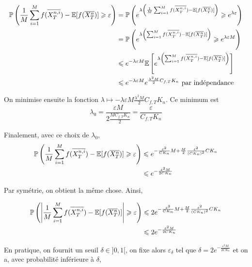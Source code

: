 \begin{equation*}
\begin{split}
  \mathbb{P}\left( \frac{1}{M} \sum_{i=1}^M f(\overline{X_T^{n,i}}) - \mathbb{E}[f(\overline{X_T^n})] \geqslant \varepsilon \right) &=  \mathbb{P}\left( e^{\lambda \left(\frac{1}{M} \sum_{i=1}^M f(\overline{X_T^{n,i}}) - \mathbb{E}[f(\overline{X_T^n})]\right)} \geqslant e^{\lambda \varepsilon} \right) \\
  &= \mathbb{P}\left( e^{\lambda \left( \sum_{i=1}^M f(\overline{X_T^{n,i}}) - \mathbb{E}[f(\overline{X_T^n})]\right)} \geqslant e^{\lambda \varepsilon M} \right) \\
  &\leqslant e^{-\lambda \varepsilon M} \mathbb{E}\left[ e^{\lambda \left( \sum_{i=1}^M f(\overline{X_T^{n,i}}) - \mathbb{E}[f(\overline{X_T^n})]\right)} \right] \\
  &\leqslant e^{-\lambda \varepsilon M} e^{ \frac{\lambda^2 M}{2} C_{f,T} K_n } \text{ par indépendance} \\
\end{split}
\end{equation*}

On minimise ensuite la fonction $\lambda \mapsto  -\lambda \varepsilon M \frac{\lambda^2 M}{2} C_{f,T} K_n$. Ce minimum est 
\[ \lambda_0 = \frac{\varepsilon M}{2 \frac{MC_{f,T} K_n}{2}} = \frac{\varepsilon}{C_{f,T} K_n} \]

Finalement, avec ce choix de $\lambda_0$, 
\begin{equation*}
\begin{split}
  \mathbb{P}\left( \frac{1}{M} \sum_{i=1}^M f(\overline{X_T^{n,i}}) - \mathbb{E}[f(\overline{X_T^n})] \geqslant \varepsilon \right) &\leqslant e^{ -\frac{\varepsilon^2}{CK_n} M + \frac{M}{2} \frac{\varepsilon^2}{(CK_n)^2}CK_n } \\
  &\leqslant e^{- \frac{\varepsilon^2 M}{2 C K_n} }
\end{split}
\end{equation*}

Par symétrie, on obtient la même chose. Ainsi,


\begin{equation*}
\begin{split}
  \mathbb{P}\left( \left\vert \frac{1}{M} \sum_{i=1}^M f(\overline{X_T^{n,i}}) - \mathbb{E}[f(\overline{X_T^n})] \right\vert \geqslant \varepsilon \right) &\leqslant 2 e^{ -\frac{\varepsilon^2}{CK_n} M + \frac{M}{2} \frac{\varepsilon^2}{(CK_n)^2}CK_n } \\
  &\leqslant 2e^{- \frac{\varepsilon^2 M}{2 C K_n} }
\end{split}
\end{equation*}

En pratique, on fournit un seuil $\delta \in ]0,1[$, on fixe alors $\varepsilon_\delta$ tel que $\delta = 2e^{- \frac{\varepsilon^2 M}{2 C K_n} }$ et on a, avec probabilité inférieure à $\delta$, 

